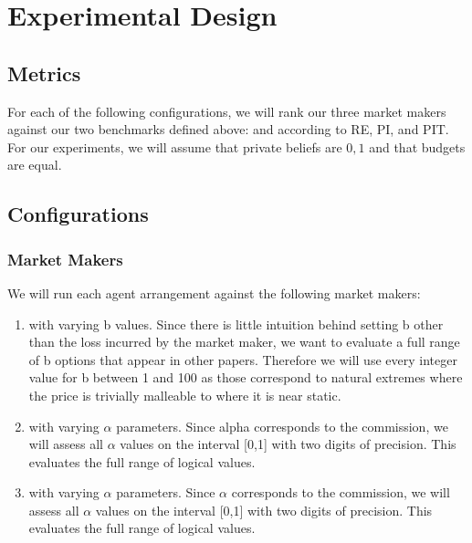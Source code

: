 \section{Experimental Design}
\subsection{Metrics}
For each of the following configurations, we will rank our three market makers against our two benchmarks defined above:  and  according to RE, PI, and PIT. For our experiments, we will assume that private beliefs are ${0,1}$ and that budgets are equal.\\

\subsection{Configurations}
\subsubsection{Market Makers}
We will run each agent arrangement against the following market makers:
\begin{enumerate}
\item {} with varying b values. Since there is little intuition behind setting b other than the loss incurred by the market maker, we want to evaluate a full range of b options that appear in other papers. Therefore we will use every integer value for b between 1 and 100 as those correspond to natural extremes where the price is trivially malleable to where it is near static.

\item {} with varying $\alpha$ parameters. Since alpha corresponds to the commission, we will assess all $\alpha$ values on the interval [0,1] with two digits of precision. This evaluates the full range of logical values.

\item {} with varying $\alpha$ parameters. Since $\alpha$ corresponds to the commission, we will assess all $\alpha$ values on the interval [0,1] with two digits of precision. This evaluates the full range of logical values.
\end{enumerate}


